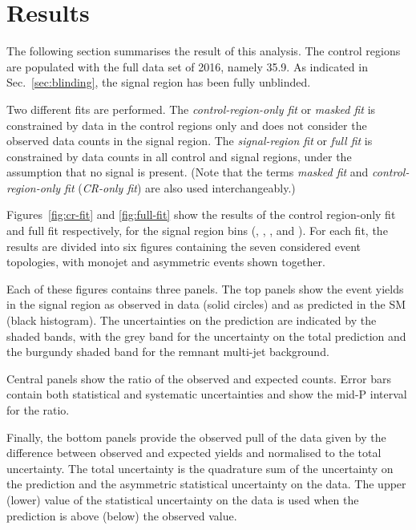 \section{Results}
\label{sec:results}

The following section summarises the result of this analysis. The
control regions are populated with the full data set of 2016, namely
35.9\fbinv. As indicated in Sec.~\ref{sec:blinding}, the signal region
has been fully unblinded. 

Two different fits are performed. The {\it control-region-only fit} or
{\it masked fit} is constrained by data in the control regions only
and does not consider the observed data counts in the signal
region. The {\it signal-region fit} or {\it full fit} is constrained
by data counts in all control and signal regions, under the assumption that no
signal is present. 
(Note that the terms
{\it masked fit} and {\it control-region-only fit} ({\it CR-only fit})
are also used interchangeably.)

Figures~\ref{fig:cr-fit} and \ref{fig:full-fit} show the results of the control region-only fit and full fit respectively, for the signal region bins (\nj, \nb, \scalht, and \mht).
For each fit, the results are divided into six figures containing the seven considered event topologies, with monojet and asymmetric events shown together.

Each of these figures contains three panels.  The top panels show the
event yields in the signal region as observed in data (solid circles) and as
predicted in the SM (black histogram).  The uncertainties on the prediction are
indicated by the shaded bands, with the grey band for the uncertainty on the
total prediction and the burgundy shaded band for the remnant multi-jet
background.

Central panels show the ratio of the observed and expected counts.
Error bars contain both statistical and systematic uncertainties and show the
mid-P interval for the ratio.

Finally, the bottom panels provide the observed pull of the data given by the
difference between observed and expected yields and normalised to the total
uncertainty.  The total uncertainty is the quadrature sum of the uncertainty on
the prediction and the asymmetric statistical uncertainty on the data. The
upper (lower) value of the statistical uncertainty on the data is used when the
prediction is above (below) the observed value.

